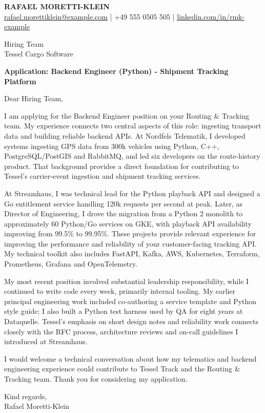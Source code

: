 \documentclass[11pt,a4paper]{article}
\begin{document}
{\large\bfseries\color{primarycolor} RAFAEL MORETTI-KLEIN}\\
{\small \href{mailto:rafael.morettiklein@example.com}{rafael.morettiklein@example.com} | +49 555 0505 505 | \href{https://linkedin.com/in/rmk-example}{linkedin.com/in/rmk-example}}

Hiring Team\\
Tessel Cargo Software

\textbf{Application: Backend Engineer (Python) - Shipment Tracking Platform}

Dear Hiring Team,

I am applying for the Backend Engineer position on your Routing \& Tracking team. My experience connects two central aspects of this role: ingesting transport data and building reliable backend APIs. At Nordfels Telematik, I developed systems ingesting GPS data from 300k vehicles using Python, C++, PostgreSQL/PostGIS and RabbitMQ, and led six developers on the route-history product. That background provides a direct foundation for contributing to Tessel's carrier-event ingestion and shipment tracking services.

At Streamhaus, I was technical lead for the Python playback API and designed a Go entitlement service handling 120k requests per second at peak. Later, as Director of Engineering, I drove the migration from a Python 2 monolith to approximately 60 Python/Go services on GKE, with playback API availability improving from 99.5\% to 99.95\%. These projects provide relevant experience for improving the performance and reliability of your customer-facing tracking API. My technical toolkit also includes FastAPI, Kafka, AWS, Kubernetes, Terraform, Prometheus, Grafana and OpenTelemetry.

My most recent position involved substantial leadership responsibility, while I continued to write code every week, primarily internal tooling. My earlier principal engineering work included co-authoring a service template and Python style guide; I also built a Python test harness used by QA for eight years at Dataquelle. Tessel's emphasis on short design notes and reliability work connects closely with the RFC process, architecture reviews and on-call guidelines I introduced at Streamhaus.

I would welcome a technical conversation about how my telematics and backend engineering experience could contribute to Tessel Track and the Routing \& Tracking team. Thank you for considering my application.

Kind regards,\\
Rafael Moretti-Klein
\end{document}
